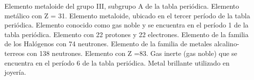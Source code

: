 \begin{minipage}{0.83\linewidth}
    \begin{choices}
        \choice Elemento metaloide del grupo III, subgrupo A de la tabla periódica.
        \choice Elemento metálico con Z = 31.
        \choice Elemento metaloide, ubicado en el tercer período de la tabla periódica.
        \choice Elemento conocido como gas noble y se encuentra en el período 1 de la tabla periódica.
        \choice Elemento con 22 protones y 22 electrones.
        \choice Elemento de la familia de los Halógenos con 74 neutrones.
        \choice Elemento de la familia de metales alcalino-terreos con 138 neutrones.
        \choice Elemento con Z =83.
        \choice Gas inerte (gas noble) que se encuentra en el período 6 de la tabla periódica.
        \choice Metal brillante utilizado en joyería.
    \end{choices}
\end{minipage}